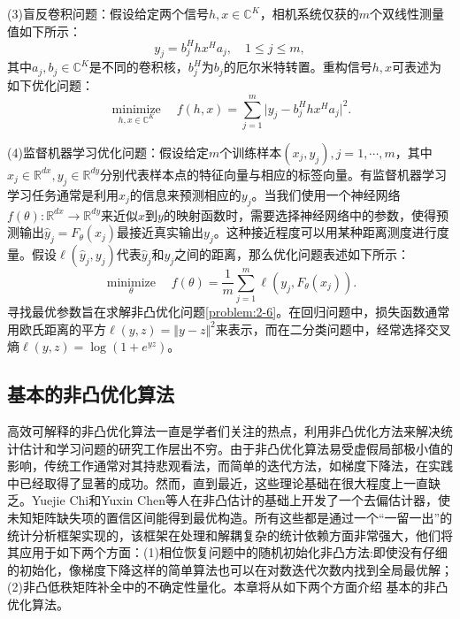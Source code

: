(3)盲反卷积问题：假设给定两个信号$h,x\in\mathbb{C}^K$，相机系统仅获的$m$个双线性测量值如下所示：
\begin{equation} \label{equation:2-4}
	y_{j}=b^\mathit{H}_jhx^\mathit{H}a_{j},\quad 1\leq j\leq m,
\end{equation}
其中$a_j,b_j\in\mathbb{C}^K$是不同的卷积核，$b_j^{\mathit{H}}$为$b_j$的厄尔米特转置。重构信号$h,x$可表述为如下优化问题：
\begin{equation} \label{problem:2-5}
	\mathop{\text{minimize}}\limits_{h,x\in\mathbb{C}^K}\quad f(h,x)=\sum_{j=1}^{m}\vert y_{j}-b^\mathit{H}_jhx^\mathit{H}a_{j} \vert^2.
\end{equation}

(4)监督机器学习优化问题：假设给定$m$个训练样本$\left( x_{j}, y_{j}\right),j=1,\cdots,m$，其中$x_j\in\mathbb{R}^{dx},y_j\in\mathbb{R}^{dy}$分别代表样本点的特征向量与相应的标签向量。有监督机器学习学习任务通常是利用$x_j$的信息来预测相应的$y_j$。当我们使用一个神经网络
$f(\theta):\mathbb{R}^{dx}\to{\mathbb{R}^{dy}}$来近似$x$到$y$的映射函数时，需要选择神经网络中的参数，使得预测输出$\hat{y}_{j}=F_\theta(x_j)$最接近真实输出$y_j$。这种接近程度可以用某种距离测度进行度量。假设$\ell(\hat{y}_j,y_j)$代表$\hat{y}_j$和$y_j$之间的距离，那么优化问题表述如下所示：
\begin{equation} \label{problem:2-6}
	\mathop{\text{minimize}}\limits_{\theta}\quad f(\theta)= \frac{1}{m}\sum_{j=1}^{m}\ell(y_j,F_\theta(x_j)).
\end{equation}
寻找最优参数旨在求解非凸优化问题\eqref{problem:2-6}。在回归问题中，损失函数通常用欧氏距离的平方$\ell(y,z)=\Vert{y-z}\Vert^2$来表示，而在二分类问题中，经常选择交叉熵$\ell(y,z)=\log(1+e^{yz})$。

\subsection{基本的非凸优化算法}
高效可解释的非凸优化算法一直是学者们关注的热点，利用非凸优化方法来解决统计估计和学习问题的研究工作层出不穷。由于非凸优化算法易受虚假局部极小值的影响，传统工作通常对其持悲观看法，而简单的迭代方法，如梯度下降法，在实践中已经取得了显著的成功。然而，直到最近，这些理论基础在很大程度上一直缺乏。Yuejie Chi和Yuxin Chen等人在非凸估计的基础上开发了一个去偏估计器，使未知矩阵缺失项的置信区间能得到最优构造\supercite{Cong}。所有这些都是通过一个``一留一出”的统计分析框架实现的，该框架在处理和解耦复杂的统计依赖方面非常强大，他们将其应用于如下两个方面：(1)相位恢复问题中的随机初始化非凸方法:即使没有仔细的初始化，像梯度下降这样的简单算法也可以在对数迭代次数内找到全局最优解；(2)非凸低秩矩阵补全中的不确定性量化。本章将从如下两个方面介绍 基本的非凸优化算法。

